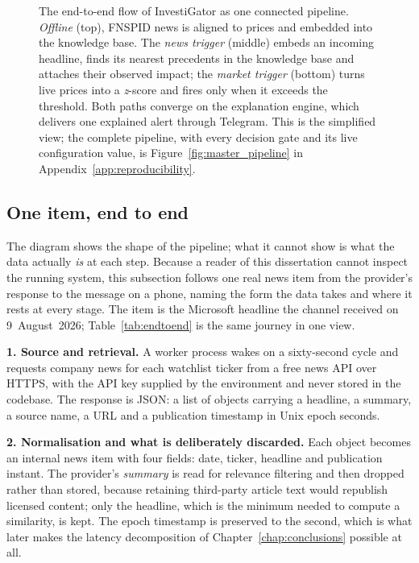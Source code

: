 \begin{figure}[ht]
\caption[End-to-end data and processing flow]{The end-to-end flow of InvestiGator as one connected
pipeline. \emph{Offline} (top), FNSPID news is aligned to prices and embedded into the knowledge base.
The \emph{news trigger} (middle) embeds an incoming headline, finds its nearest precedents in the
knowledge base and attaches their observed impact; the \emph{market trigger} (bottom) turns live prices
into a \emph{z}-score and fires only when it exceeds the threshold. Both paths converge on the
explanation engine, which delivers one explained alert through Telegram. This is the simplified view;
the complete pipeline, with every decision gate and its live configuration value, is
Figure~\ref{fig:master_pipeline} in Appendix~\ref{app:reproducibility}.}
\label{fig:workflow}
\end{figure}

\subsection*{One item, end to end}
\label{sec:investigator_endtoend}

The diagram shows the shape of the pipeline; what it cannot show is what the data actually \emph{is}
at each step. Because a reader of this dissertation cannot inspect the running system, this subsection
follows one real news item from the provider's response to the message on a phone, naming the form the
data takes and where it rests at every stage. The item is the Microsoft headline the channel received
on 9~August~2026; Table~\ref{tab:endtoend} is the same journey in one view.

\textbf{1. Source and retrieval.} A worker process wakes on a sixty-second cycle and requests company
news for each watchlist ticker from a free news API over HTTPS, with the API key supplied by the
environment and never stored in the codebase. The response is JSON: a list of objects carrying a
headline, a summary, a source name, a URL and a publication timestamp in Unix epoch seconds.

\textbf{2. Normalisation and what is deliberately discarded.} Each object becomes an internal news
item with four fields: date, ticker, headline and publication instant. The provider's \emph{summary}
is read for relevance filtering and then dropped rather than stored, because retaining third-party
article text would republish licensed content; only the headline, which is the minimum needed to
compute a similarity, is kept. The epoch timestamp is preserved to the second, which is what later
makes the latency decomposition of Chapter~\ref{chap:conclusions} possible at all.

